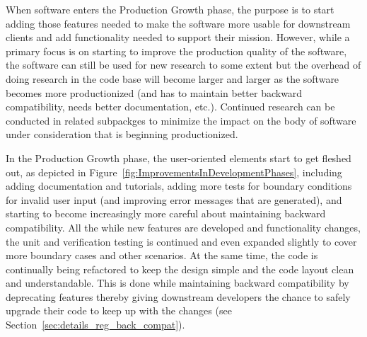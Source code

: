 \documentclass[11pt]{SANDreport}
\begin{document}
\begin{figure}
\begin{center}
\end{center}
\end{figure}

When software enters the Production Growth phase, the purpose is to
start adding those features needed to make the software more usable
for downstream clients and add functionality needed to support their
mission.  However, while a primary focus is on starting to improve the
production quality of the software, the software can still be used for
new research to some extent but the overhead of doing research in the
code base will become larger and larger as the software becomes more
productionized (and has to maintain better backward compatibility,
needs better documentation, etc.).  Continued research can be
conducted in related subpackges to minimize the impact on the body of
software under consideration that is beginning productionized.

In the Production Growth phase, the user-oriented elements start to
get fleshed out, as depicted in
Figure~\ref{fig:ImprovementsInDevelopmentPhases}, including adding
documentation and tutorials, adding more tests for boundary conditions
for invalid user input (and improving error messages that are
generated), and starting to become increasingly more careful about
maintaining backward compatibility.  All the while new features are
developed and functionality changes, the unit and verification testing
is continued and even expanded slightly to cover more boundary cases
and other scenarios.  At the same time, the code is continually being
refactored to keep the design simple and the code layout clean and
understandable.  This is done while maintaining backward compatibility
by deprecating features thereby giving downstream developers the
chance to safely upgrade their code to keep up with the changes (see
Section~\ref{sec:details_reg_back_compat}).
\end{document}
